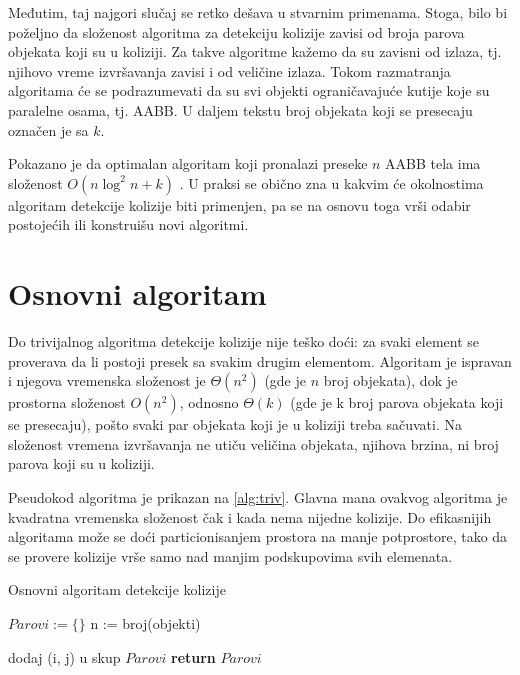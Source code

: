 \documentclass[12pt,oneside]{memoir}
\begin{document}
Međutim, taj najgori slučaj se retko dešava u stvarnim primenama. 
Stoga, bilo bi poželjno da složenost algoritma za detekciju kolizije zavisi od broja parova objekata koji su u koliziji.
Za takve algoritme kažemo da su zavisni od izlaza, tj. njihovo vreme izvršavanja zavisi i od veličine izlaza. 
Tokom razmatranja algoritama će se podrazumevati da su svi objekti ograničavajuće kutije koje su paralelne osama,
tj. AABB. U daljem tekstu broj objekata koji se presecaju označen je sa $k$.

Pokazano je da optimalan algoritam koji pronalazi preseke $n$ AABB tela ima složenost 
$O(n \log^2 n + k)$ \cite{glavna1}. 
U praksi se obično zna u kakvim će okolnostima algoritam detekcije kolizije biti primenjen, pa 
se na osnovu toga vrši odabir postojećih ili konstruišu novi algoritmi.

\section{Osnovni algoritam}
\label{subsec:triv}

Do trivijalnog algoritma detekcije kolizije nije teško doći: za svaki element se proverava da li postoji presek sa svakim drugim elementom.
Algoritam je ispravan i njegova vremenska složenost je $\Theta (n^2) $ (gde je $n$ broj objekata), dok je prostorna složenost
$O(n^2)$, odnosno $\Theta(k)$ (gde je k broj parova objekata koji se presecaju), pošto svaki par objekata koji je u koliziji treba sačuvati.
Na složenost vremena izvršavanja ne utiču veličina objekata, njihova brzina, ni broj parova koji su u koliziji.

Pseudokod algoritma je prikazan na \ref{alg:triv}.
Glavna mana ovakvog algoritma je kvadratna vremenska složenost čak i kada nema nijedne kolizije.
Do efikasnijih algoritama može se doći particionisanjem prostora na manje potprostore, tako da
se provere kolizije vrše samo nad manjim podskupovima svih elemenata.

\begin{algorithm}
	\caption{Osnovni algoritam detekcije kolizije}
    \label{alg:triv}
	\begin{algorithmic}[1]
		\State $Parovi := \{ \}$
		\State n := broj(objekti)

				\State dodaj (i, j) u skup $Parovi$
			\EndIf		
		\EndFor
		\EndFor
		\State \textbf{return} $Parovi$
		\EndProcedure
    \end{algorithmic}
\end{algorithm}
\end{document}
